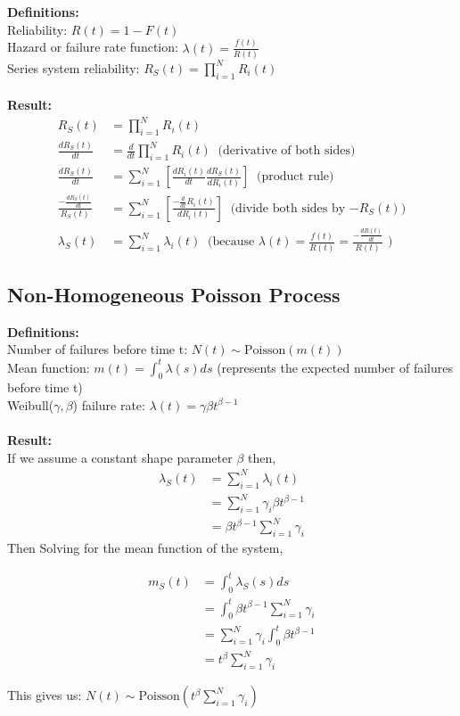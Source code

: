 \documentclass[12pt]{article}
\begin{document}
\textbf{Definitions:} \\
\noindent
Reliability: $R(t) = 1 - F(t)$ \\
Hazard or failure rate function: $\lambda(t) = \frac{f(t)}{R(t)}$ \\
Series system reliability: $R_S(t) = \prod_{i = 1}^N R_i(t)$
\\
\\
\textbf{Result:}
$$
\begin{aligned}
	R_S(t) &= \prod_{i = 1}^N R_i(t) \\
	\frac{dR_S(t)}{dt} &= \frac{d}{dt} \prod_{i = 1}^N R_i(t) \; \; \text{(derivative of both sides)} \\
	\frac{dR_S(t)}{dt} &= \sum_{i=1}^N \left[ \frac{dR_i(t)}{dt} \frac{dR_S(t)}{dR_i(t)} \right] \; \; \text{(product rule)} \\
    \frac{-\frac{dR_S(t)}{dt}}{R_S(t)} &= \sum_{i=1}^N \left[  \frac{-\frac{d}{dt}R_i(t)}{dR_i(t)} \right] \; \; \text{(divide both sides by $-R_S(t)$)} \\
    \lambda_S(t) &= \sum_{i = 1}^N \lambda_i(t) \; \; \text{(because $\lambda(t) = \frac{f(t)}{R(t)} = \frac{-\frac{dR(t)}{dt}}{R(t)}$ )}
\end{aligned}
$$

\subsection{Non-Homogeneous Poisson Process}

\textbf{Definitions:} \\
\noindent
Number of failures before time t: $N(t) \sim \text{Poisson}(m(t))$ \\
Mean function: $m(t) = \int_0^t \lambda(s)ds$ (represents the expected number of failures before time t) \\
Weibull($\gamma, \beta $) failure rate: $\lambda(t) = \gamma\beta t^{\beta - 1}$
\\
\\
\textbf{Result:}\\
If we assume a constant shape parameter $\beta$ then,\\
$$
\begin{aligned}
	\lambda_S(t) &= \sum_{i = 1}^N \lambda_i(t) \\
    &= \sum_{i = 1}^N \gamma_i\beta t^{\beta - 1} \\
    &= \beta t^{\beta -1} \sum_{i = 1}^N \gamma_i
\end{aligned}
$$
\newpage
Then Solving for the mean function of the system,

$$
\begin{aligned}
	m_S(t) &= \int_0^t \lambda_S(s)ds \\
    &= \int_0^t \beta t^{\beta -1} \sum_{i = 1}^N \gamma_i \\
    &= \sum_{i = 1}^N \gamma_i \int_0^t \beta t^{\beta -1} \\
    &= t^\beta \sum_{i = 1}^N \gamma_i
\end{aligned}
$$

This gives us: $N(t) \sim \text{Poisson}(t^\beta \sum_{i = 1}^N \gamma_i)$
\end{document}
